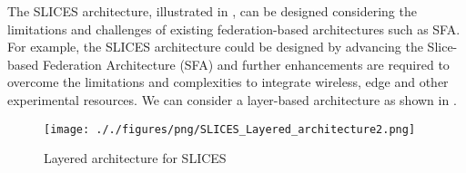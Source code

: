 The SLICES architecture, illustrated in , can be designed considering the limitations and challenges of existing federation-based architectures such as SFA. For example, the SLICES architecture could be designed by advancing the Slice-based Federation Architecture (SFA) and further enhancements are required to overcome the limitations and complexities to integrate wireless, edge and other experimental resources. We can consider a layer-based architecture as shown in .

\begin{figure*}[!th]
    \centering
    \texttt{[image: ././figures/png/SLICES\_Layered\_architecture2.png]}
	\caption{Layered architecture for SLICES}
	\label{fig:SLICES-Layered-architecture}
\end{figure*}


